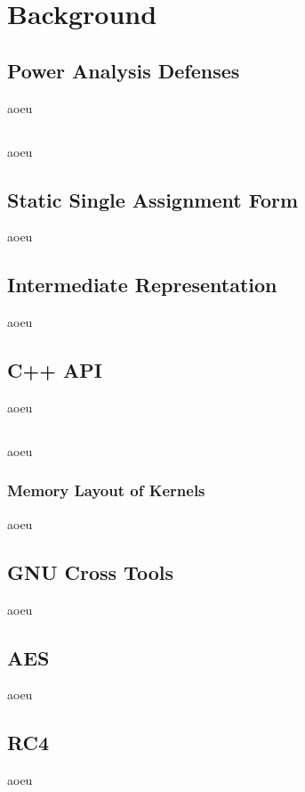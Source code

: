 \section{Background}
\label{background}
\subsection{Power Analysis Defenses}
aoeu

\subsection{\llvm{}}
\label{llvm}
aoeu

\subsection{Static Single Assignment Form}
\label{ssa}
aoeu

\subsection{\llvm{} Intermediate Representation}
\label{ir}
aoeu

\subsection{\llvm{} C++ API}
\label{api}
aoeu

\subsection{\qemu{}}
aoeu

\subsubsection{Memory Layout of \qemu{} Kernels}
\label{memory}
aoeu

\subsection{GNU Cross Tools}
aoeu

\subsection{AES}
aoeu

\subsection{RC4}
aoeu
